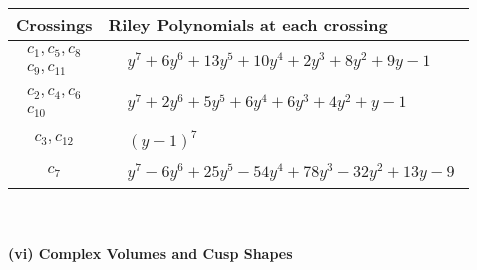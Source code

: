 \documentclass[1p]{elsarticle_modified}
\theoremstyle{definition}
\begin{document}
\begin{tabular}{m{50pt}|m{274pt}}
Crossings & \hspace{64pt}Riley Polynomials at each crossing \\
\hline $$\begin{aligned}c_{1},c_{5},c_{8}\\c_{9},c_{11}\end{aligned}$$&$\begin{aligned}
&y^7+6 y^6+13 y^5+10 y^4+2 y^3+8 y^2+9 y-1
\end{aligned}$\\
\hline $$\begin{aligned}c_{2},c_{4},c_{6}\\c_{10}\end{aligned}$$&$\begin{aligned}
&y^7+2 y^6+5 y^5+6 y^4+6 y^3+4 y^2+y-1
\end{aligned}$\\
\hline $$\begin{aligned}c_{3},c_{12}\end{aligned}$$&$\begin{aligned}
&(y-1)^7
\end{aligned}$\\
\hline $$\begin{aligned}c_{7}\end{aligned}$$&$\begin{aligned}
&y^7-6 y^6+25 y^5-54 y^4+78 y^3-32 y^2+13 y-9
\end{aligned}$\\
\hline
\end{tabular}\\~\\
\newpage\flushleft \textbf{(vi) Complex Volumes and Cusp Shapes}
\end{document}
